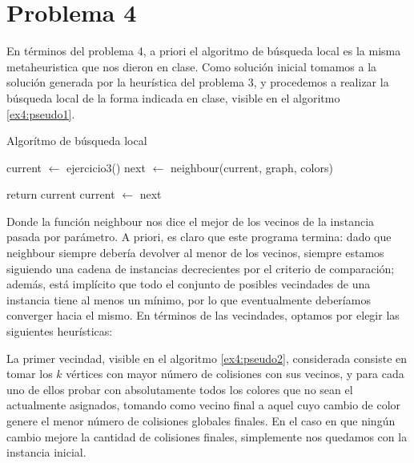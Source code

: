 \documentclass{article}
\theoremstyle{definition}
\theoremstyle{remark}
\begin{document}
\section{Problema 4}

En términos del problema 4, a priori el algoritmo de búsqueda local es la misma metaheuristica que nos dieron en clase. Como solución inicial tomamos a la solución generada por la heurística del problema 3, y procedemos a realizar la búsqueda local de la forma indicada en clase, visible en el algoritmo \ref{ex4:pseudo1}.

\begin{algorithm}
\caption{Algorítmo de búsqueda local}
\label{ex4:pseudo1}

\begin{algorithmic}
\State current $\gets$ ejercicio3()
    \State next $\gets$ neighbour(current, graph, colors)
    
        \State return current
    \Else
        \State current $\gets$ next
    \EndIf
\EndWhile
\end{algorithmic}
\end{algorithm}

Donde la función neighbour nos dice el mejor de los vecinos de la instancia pasada por parámetro. A priori, es claro que este programa termina: dado que neighbour siempre debería devolver al menor de los vecinos, siempre estamos siguiendo una cadena de instancias decrecientes por el criterio de comparación; además, está implícito que todo el conjunto de posibles vecindades de una instancia tiene al menos un mínimo, por lo que eventualmente deberíamos converger hacia el mismo. En términos de las vecindades, optamos por elegir las siguientes heurísticas:

La primer vecindad, visible en el algoritmo \ref{ex4:pseudo2}, considerada consiste en tomar los $k$ vértices con mayor número de colisiones con sus vecinos, y para cada uno de ellos probar con absolutamente todos los colores que no sean el actualmente asignados, tomando como vecino final a aquel cuyo cambio de color genere el menor número de colisiones globales finales. En el caso en que ningún cambio mejore la cantidad de colisiones finales, simplemente nos quedamos con la instancia inicial.
\end{document}
